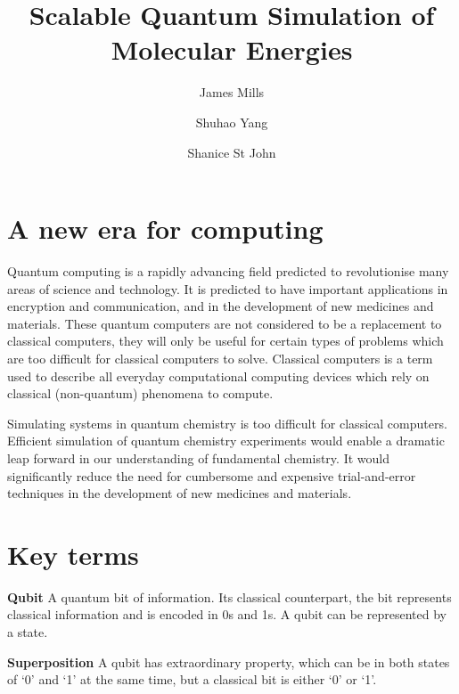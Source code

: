 \documentclass[14pt,landscape,color=UCLdarkred,margin=3cm]{uclposter}
\title{Scalable Quantum Simulation of Molecular Energies}
\author{James Mills}
\author{Shuhao Yang}
\author{Shanice St John}
\affil[1]{MSc Quantum Technologies, UCL}
\begin{document}

\maketitle

\begin{multicols}{3}

\section*{A new era for computing}


Quantum computing is a rapidly advancing field predicted to revolutionise many
areas of science and technology. It is predicted to have important applications in encryption and communication, and in the development of new medicines and materials. These quantum computers are not considered to be a replacement to classical computers, they will only be useful for certain types of problems which are too difficult for classical computers to solve. Classical computers is a term used to describe all everyday computational computing devices which rely on classical (non-quantum) phenomena to compute.

Simulating systems in quantum chemistry is too difficult for classical computers. Efficient simulation of quantum chemistry experiments would enable a dramatic leap forward in our understanding of fundamental chemistry. It would significantly reduce the need for cumbersome and expensive trial-and-error techniques in the development of new medicines and materials.

\section*{Key terms}


\begin{highlightbox}
	\textbf{Qubit} A quantum bit of information. Its classical counterpart, the bit represents classical information and is encoded in 0s and 1s. A qubit can be represented by a state.
\end{highlightbox}

\begin{highlightbox}
  \textbf{Superposition} A qubit has extraordinary property, which can be in both states of `0' and `1' at the same time, but a classical bit is either `0' or `1'.
\end{highlightbox}




\end{multicols}
\end{document}
